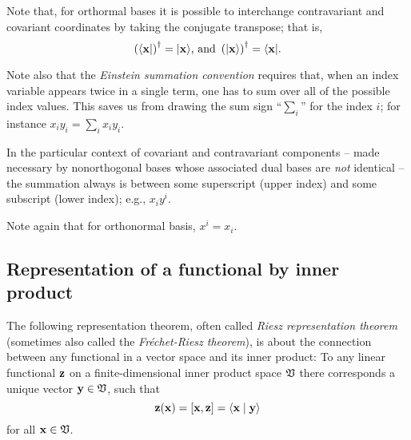 Note that, for orthormal bases it is possible to interchange contravariant and covariant coordinates by
taking the conjugate transpose; that is,
\begin{equation}
\left(\langle {\bf x} \vert \right)^\dagger = \vert {\bf x}  \rangle
\textrm {, and }
\left(\vert {\bf x}  \rangle \right)^\dagger = \langle {\bf x} \vert
.
\label{2015-m-ch-fdlvs-inter}
\end{equation}


Note also that the {\em Einstein summation convention}
requires that, when an index variable appears twice in a single term, one has to
sum over all of the possible index values.
This saves us from drawing the sum sign ``$\sum_i$'' for the index $i$;
for instance $x_iy_i =\sum_{i}x_iy_i$.

In the particular context of covariant and contravariant components
--
made necessary by nonorthogonal bases whose associated dual bases are {\em not} identical
--
the summation always is between some superscript (upper index) and some subscript (lower index);
e.g., $x_iy^i$.

Note again that for orthonormal basis,
$x^i=x_i$.


\subsection{Representation of a functional by inner product}
\label{2011-m-corr-bil-ip}
The following representation theorem,
often called
{\em Riesz representation theorem}
(sometimes also called the {\em Fr\'echet-Riesz theorem}),
is about the connection between any functional
in a vector space and its inner product:
To any linear functional ${\bf z}$
on a finite-dimensional inner product space ${\frak V}$
there corresponds a unique vector   ${\bf y}\in {\frak V}$,
such that
\begin{equation}
{\bf z} ({\bf x}) =[{\bf x}, {\bf z}]= \langle {\bf x}\mid {\bf y}\rangle
\label{2015-m-ch-fdlvs-e1}
\end{equation}
for all ${\bf x}\in {\frak V}$.

